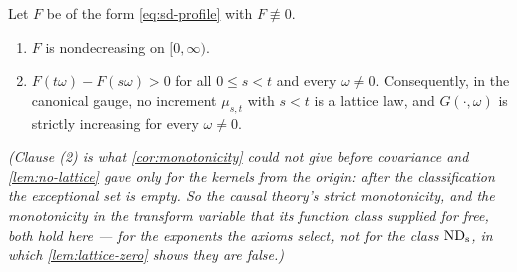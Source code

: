 \begin{proposition}
\label{prop:strict-positivity}
\leanok
Let $F$ be of the form \ref{eq:sd-profile} with $F \not\equiv 0$.
\begin{enumerate}
\item $F$ is nondecreasing on $[0,\infty)$.
\item $F(t\omega) - F(s\omega) > 0$ for all $0 \le s < t$ and every $\omega \ne 0$.
Consequently, in the canonical gauge, no increment $\mu_{s,t}$ with $s < t$ is a lattice law,
and $G(\cdot,\omega)$ is strictly increasing for every $\omega \ne 0$.
\end{enumerate}
\statusT\quad\emph{(Clause (2) is what \ref{cor:monotonicity} could not give before covariance
and \ref{lem:no-lattice} gave only for the kernels from the origin: after the classification
the exceptional set is empty. So the causal theory's strict monotonicity, and the monotonicity
in the transform variable that its function class supplied for free, both hold here --- for
the exponents the axioms select, not for the class $\mathrm{ND}_{\mathrm{s}}$, in which
\ref{lem:lattice-zero} shows they are false.)}
\end{proposition}


